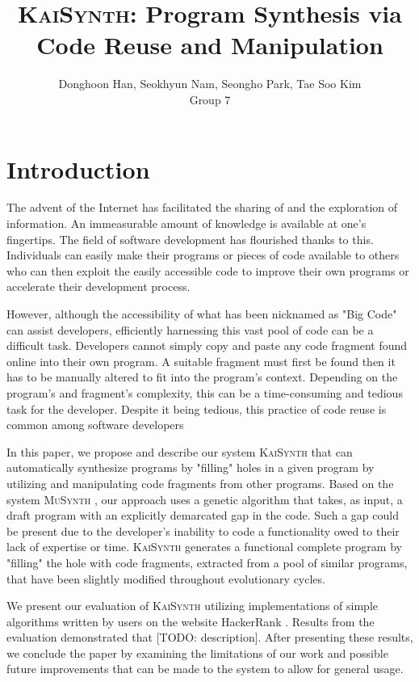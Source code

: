 \documentclass{article}
\title{\textsc{KaiSynth}: Program Synthesis via Code Reuse and Manipulation}
\author{Donghoon Han, Seokhyun Nam, Seongho Park, Tae Soo Kim\\Group 7}
\begin{document}
\maketitle

\section{Introduction}
The advent of the Internet has facilitated the sharing of and the exploration of information. An immeasurable amount of knowledge is available at one's fingertips. The field of software development has flourished thanks to this. Individuals can easily make their programs or pieces of code available to others who can then exploit the easily accessible code to improve their own programs or accelerate their development process.

However, although the accessibility of what has been nicknamed as "Big Code" can assist developers, efficiently harnessing this vast pool of code can be a difficult task. Developers cannot simply copy and paste any code fragment found online into their own program. A suitable fragment must first be found then it has to be manually altered to fit into the program's context. Depending on the program's and fragment's complexity, this can be a time-consuming and tedious task for the developer. Despite it being tedious, this practice of code reuse is common among software developers 

In this paper, we propose and describe our system \textsc{KaiSynth} that can automatically synthesize programs by "filling" holes in a given program by utilizing and manipulating code fragments from other programs. Based on the system \textsc{MuSynth} \cite{musynth}, our approach uses a genetic algorithm that takes, as input, a draft program with an explicitly demarcated gap in the code. Such a gap could be present due to the developer's inability to code a functionality owed to their lack of expertise or time. \textsc{KaiSynth} generates a functional complete program by "filling" the hole with code fragments, extracted from a pool of similar programs, that have been slightly modified throughout evolutionary cycles. 

We present our evaluation of \textsc{KaiSynth} utilizing implementations of simple algorithms written by users on the website HackerRank \cite{hackerrank}. Results from the evaluation demonstrated that [TODO: description]. After presenting these results, we conclude the paper by examining the limitations of our work and possible future improvements that can be made to the system to allow for general usage.
\end{document}
